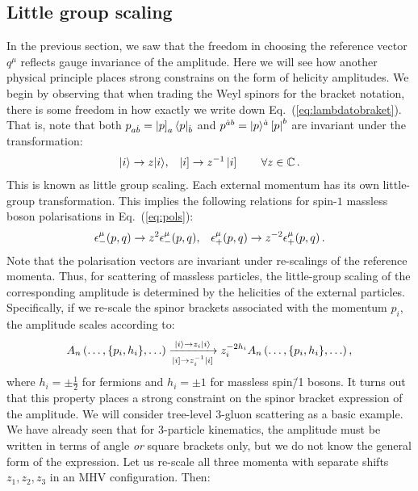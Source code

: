 \documentclass[main.tex]{subfiles}
\begin{document}
\subsection{Little group scaling} \label{sec:littlegroup}
In the previous section, we saw that the freedom in choosing the reference vector $q^\mu$ reflects gauge invariance of the amplitude. Here we will see how another physical principle places strong constrains on the form of helicity amplitudes. We begin by observing that when trading the Weyl spinors for the bracket notation, there is some freedom in how exactly we write down Eq.~(\ref{eq:lambdatobraket}). That is, note that both $p_{a\dot{b}} = \left| p \right]_a \langle p|_{\dot{b}}$ and $p^{\dot{a}b} = |p \rangle^{\dot{a}} \left[ p \right|^b$ are invariant under the transformation:
\begin{align} \label{eq:littlegroupscaling}
    |i \rangle \rightarrow z |i \rangle, && \left| i \right] \rightarrow z^{-1} \left| i \right] \qquad \forall z \in \mathbb{C}\,.  
\end{align}
This is known as little group scaling. Each external momentum has its own little-group transformation. This implies the following relations for spin-$1$ massless boson polarisations in Eq.~(\ref{eq:pols}):
\begin{align}
    \epsilon^\mu_- (p,q) \rightarrow z^2 \epsilon^\mu_- (p,q), &&  \epsilon^\mu_+ (p,q) \rightarrow z^{-2} \epsilon^\mu_+ (p,q) \,.
\end{align}
Note that the polarisation vectors are invariant under re-scalings of the reference momenta. Thus, for scattering of massless particles, the little-group scaling of the corresponding amplitude is determined by the helicities of the external particles. Specifically, if we re-scale the spinor brackets associated with the momentum $p_i$, the amplitude scales according to:
\begin{equation}
    A_n \left(\ldots, \{p_i, h_i\}, \ldots \right) \xrightarrow[\ketsq{i} \rightarrow z_i^{-1}\ketsq{i}]{\ket{i} \rightarrow z_i\ket{i}} z_i^{-2h_i}  A_n \left(\ldots, \{p_i, h_i\}, \ldots \right),
\end{equation}
where $h_i=\pm\frac{1}{2}$ for fermions and $h_i=\pm1$ for massless spin\=/1 bosons. It turns out that this property places a strong constraint on the spinor bracket expression of the amplitude. We will consider tree-level 3-gluon scattering as a basic example. We have already seen that for 3-particle kinematics, the amplitude must be written in terms of angle \textit{or} square brackets only, but we do not know the general form of the expression. Let us re-scale all three momenta with separate shifts $z_1, z_2, z_3$ in an MHV configuration. Then:
\end{document}
